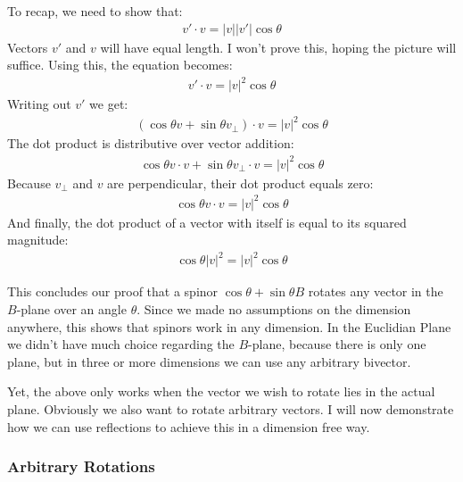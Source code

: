 \documentclass[10pt]{report}
\begin{document}
To recap, we need to show that:
\begin{align*}
    v'\cdot v = |v||v'| \cos \theta
\end{align*}
Vectors $v'$ and $v$ will have equal length. I won't prove this,
hoping the picture will suffice. Using this, the equation becomes:
\begin{align*}
    v'\cdot v = |v|^2 \cos \theta
\end{align*}
Writing out $v'$ we get:
\begin{align*}
    (\cos \theta v + \sin \theta v_\bot)\cdot v = |v|^2 \cos \theta
\end{align*}
The dot product is distributive over vector addition:
\begin{align*}
    \cos \theta v\cdot v + \sin \theta v_\bot \cdot v = |v|^2 \cos \theta
\end{align*}
Because $v_\bot$ and $v$ are perpendicular, their dot product
equals zero:
\begin{align*}
    \cos \theta v\cdot v = |v|^2 \cos \theta
\end{align*}
And finally, the dot product of a vector with itself is equal to
its squared magnitude:
\begin{align*}
    \cos \theta |v|^2 = |v|^2 \cos \theta
\end{align*}

This concludes our proof that a spinor $\cos \theta + \sin \theta
B$ rotates any vector in the $B$-plane over an angle $\theta$.
Since we made no assumptions on the dimension anywhere, this shows
that spinors work in any dimension. In the Euclidian Plane we
didn't have much choice regarding the $B$-plane, because there is
only one plane, but in three or more dimensions we can use any
arbitrary bivector.

Yet, the above only works when the vector we wish to rotate lies
in the actual plane. Obviously we also want to rotate arbitrary
vectors. I will now demonstrate how we can use reflections to
achieve this in a dimension free way.

\subsubsection{Arbitrary Rotations}
\end{document}
